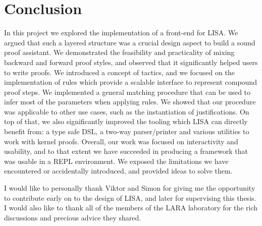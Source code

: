 \section{Conclusion}
\label{sec:conclusion}

In this project we explored the implementation of a front-end for LISA. We argued that such a layered structure was a crucial design aspect to build a sound proof assistant. We demonstrated the feasibility and practicality of mixing backward and forward proof styles, and observed that it significantly helped users to write proofs. We introduced a concept of tactics, and we focused on the implementation of rules which provide a scalable interface to represent compound proof steps. We implemented a general matching procedure that can be used to infer most of the parameters when applying rules. We showed that our procedure was applicable to other use cases, such as the instantiation of justifications. On top of that, we also significantly improved the tooling which LISA can directly benefit from: a type safe DSL, a two-way parser/printer and various utilities to work with kernel proofs. Overall, our work was focused on interactivity and usability, and to that extent we have succeeded in producing a framework that was usable in a REPL environment. We exposed the limitations we have encountered or accidentally introduced, and provided ideas to solve them.

I would like to personally thank Viktor and Simon for giving me the opportunity to contribute early on to the design of LISA, and later for supervising this thesis. I would also like to thank all of the members of the LARA laboratory for the rich discussions and precious advice they shared.
